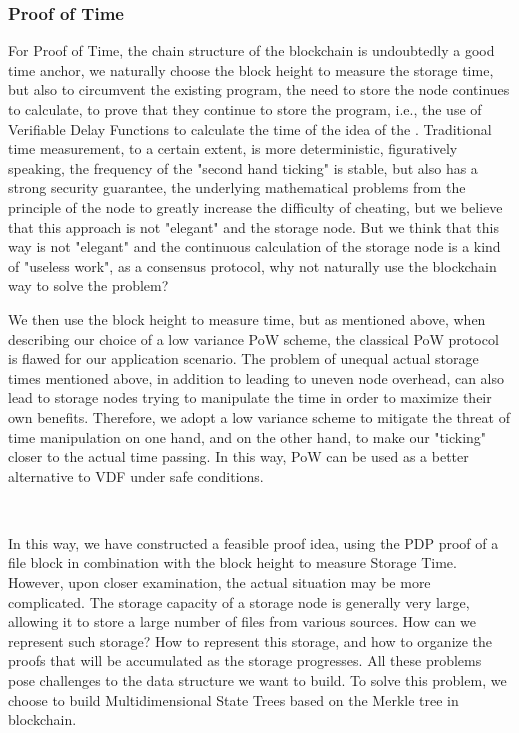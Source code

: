 \documentclass[journal]{IEEEtran}
\begin{document}
\subsubsection{Proof of Time}
For Proof of Time, the chain structure of the blockchain is undoubtedly a good time anchor, we naturally choose the block height to measure the storage time, but also to circumvent the existing program, the need to store the node continues to calculate, to prove that they continue to store the program, i.e., the use of Verifiable Delay Functions\cite{2018vdf} to calculate the time of the idea of the \cite{2019pospacetime, 2023epost}. Traditional time measurement, to a certain extent, is more deterministic, figuratively speaking, the frequency of the "second hand ticking" is stable, but also has a strong security guarantee, the underlying mathematical problems from the principle of the node to greatly increase the difficulty of cheating, but we believe that this approach is not "elegant" and the storage node. But we think that this way is not "elegant" and the continuous calculation of the storage node is a kind of "useless work", as a consensus protocol, why not naturally use the blockchain way to solve the problem?


We then use the block height to measure time, but as mentioned above, when describing our choice of a low variance PoW scheme\cite{2020bobtail}, the classical PoW protocol is flawed for our application scenario. The problem of unequal actual storage times mentioned above, in addition to leading to uneven node overhead, can also lead to storage nodes trying to manipulate the time in order to maximize their own benefits. Therefore, we adopt a low variance scheme to mitigate the threat of time manipulation on one hand, and on the other hand, to make our "ticking" closer to the actual time passing. In this way, PoW can be used as a better alternative to VDF under safe conditions.


~


In this way, we have constructed a feasible proof idea, using the PDP proof of a file block in combination with the block height to measure Storage Time. However, upon closer examination, the actual situation may be more complicated. The storage capacity of a storage node is generally very large, allowing it to store a large number of files from various sources. How can we represent such storage? How to represent this storage, and how to organize the proofs that will be accumulated as the storage progresses. All these problems pose challenges to the data structure we want to build. To solve this problem, we choose to build Multidimensional State Trees based on the Merkle tree in blockchain.
\end{document}
